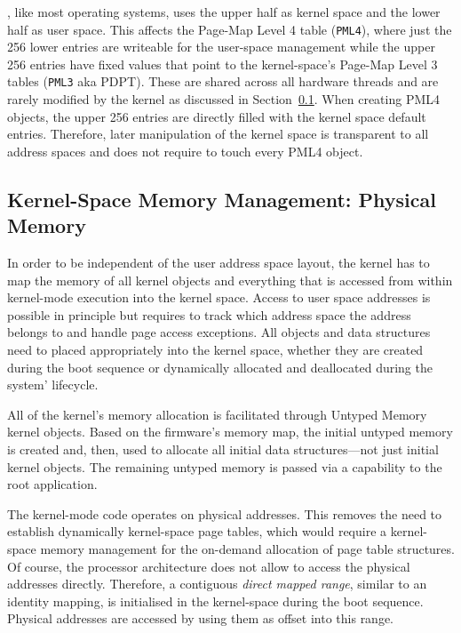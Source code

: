 \mythos, like most operating systems, uses the upper half as kernel space and the lower half as user space. This affects the Page-Map Level 4 table (\texttt{PML4}), where just the 256 lower entries are writeable for the user-space management while the upper 256 entries have fixed values that point to the kernel-space's Page-Map Level 3 tables (\texttt{PML3} aka PDPT). These are shared across all hardware threads and are rarely modified by the kernel as discussed in Section~\ref{sec:kernel-space-management}. When creating PML4 objects, the upper 256 entries are directly filled with the kernel space default entries. Therefore, later manipulation of the kernel space is transparent to all address spaces and does not require to touch every PML4 object.

\subsection{Kernel-Space Memory Management: Physical Memory}
\label{sec:kernel-space-management}
In order to be independent of the user address space layout, the kernel has to map the memory of all kernel objects and everything that is accessed from within kernel-mode execution into the kernel space. Access to user space addresses is possible in principle but requires to track which address space the address belongs to and handle page access exceptions. All objects and data structures need to placed appropriately into the kernel space,  whether they are created during the boot sequence or dynamically allocated and deallocated during the system' lifecycle.

All of the kernel's memory allocation is facilitated through Untyped Memory kernel objects. Based on the firmware's memory map, the initial untyped memory is created and, then, used to allocate all initial data structures---not just initial kernel objects. The remaining untyped memory is passed via a capability to the root application.

The kernel-mode code operates on physical addresses. This removes the need to establish dynamically kernel-space page tables, which would require a kernel-space memory management for the on-demand allocation of page table structures. Of course, the processor architecture does not allow to access the physical addresses directly. Therefore, a contiguous \emph{direct mapped range}, similar to an identity mapping, is initialised in the kernel-space during the boot sequence. Physical addresses are accessed by using them as offset into this range.

